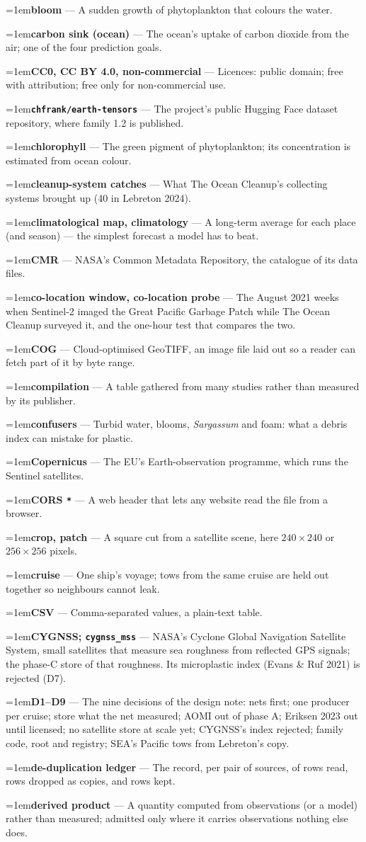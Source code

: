 \documentclass[10pt]{article}
\newcommand{\code}[1]{\texttt{#1}}
\newcommand{\gl}[2]{\par\hangindent=1em\hangafter=1\textbf{#1} --- #2\par}
\begin{document}
\gl{bloom}{A sudden growth of phytoplankton that colours the water.}
\gl{carbon sink (ocean)}{The ocean's uptake of carbon dioxide from the air; one of the four prediction goals.}
\gl{CC0, CC BY 4.0, non-commercial}{Licences: public domain; free with attribution; free only for non-commercial use.}
\gl{\code{chfrank/earth-tensors}}{The project's public Hugging Face dataset repository, where family 1.2 is published.}
\gl{chlorophyll}{The green pigment of phytoplankton; its concentration is estimated from ocean colour.}
\gl{cleanup-system catches}{What The Ocean Cleanup's collecting systems brought up (40 in Lebreton 2024).}
\gl{climatological map, climatology}{A long-term average for each place (and season) --- the simplest forecast a model has to beat.}
\gl{CMR}{NASA's Common Metadata Repository, the catalogue of its data files.}
\gl{co-location window, co-location probe}{The August 2021 weeks when Sentinel-2 imaged the Great Pacific Garbage Patch while The Ocean Cleanup surveyed it, and the one-hour test that compares the two.}
\gl{COG}{Cloud-optimised GeoTIFF, an image file laid out so a reader can fetch part of it by byte range.}
\gl{compilation}{A table gathered from many studies rather than measured by its publisher.}
\gl{confusers}{Turbid water, blooms, \emph{Sargassum} and foam: what a debris index can mistake for plastic.}
\gl{Copernicus}{The EU's Earth-observation programme, which runs the Sentinel satellites.}
\gl{CORS \code{*}}{A web header that lets any website read the file from a browser.}
\gl{crop, patch}{A square cut from a satellite scene, here $240 \times 240$ or $256 \times 256$ pixels.}
\gl{cruise}{One ship's voyage; tows from the same cruise are held out together so neighbours cannot leak.}
\gl{CSV}{Comma-separated values, a plain-text table.}
\gl{CYGNSS; \code{cygnss\_mss}}{NASA's Cyclone Global Navigation Satellite System, small satellites that measure sea roughness from reflected GPS signals; the phase-C store of that roughness. Its microplastic index (Evans \& Ruf 2021) is rejected (D7).}
\gl{D1--D9}{The nine decisions of the design note: nets first; one producer per cruise; store what the net measured; AOMI out of phase A; Eriksen 2023 out until licensed; no satellite store at scale yet; CYGNSS's index rejected; family code, root and registry; SEA's Pacific tows from Lebreton's copy.}
\gl{de-duplication ledger}{The record, per pair of sources, of rows read, rows dropped as copies, and rows kept.}
\gl{derived product}{A quantity computed from observations (or a model) rather than measured; admitted only where it carries observations nothing else does.}
\end{document}
